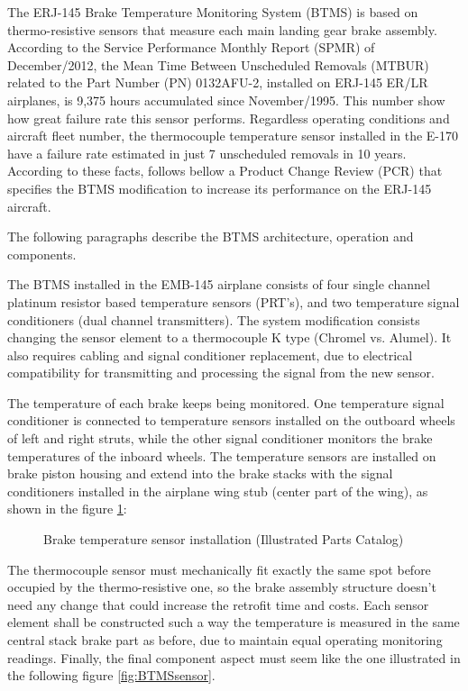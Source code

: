 ﻿The ERJ-145 Brake Temperature Monitoring System (BTMS) is based on thermo-resistive sensors that measure each main landing gear brake assembly. According to the Service Performance Monthly Report (SPMR) of December/2012, the Mean Time Between Unscheduled Removals (MTBUR) related to the Part Number (PN) 0132AFU-2, installed on ERJ-145 ER/LR airplanes, is 9,375 hours accumulated since November/1995. This number show how great failure rate this sensor performs. Regardless operating conditions and aircraft fleet number, the thermocouple temperature sensor installed in the E-170 have a failure rate estimated in just 7 unscheduled removals in 10 years. According to these facts, follows bellow a Product Change Review (PCR) that specifies the BTMS modification to increase its performance on the ERJ-145 aircraft.

The following paragraphs describe the BTMS architecture, operation and components.

The BTMS installed in the EMB-145 airplane consists of four single channel platinum resistor based temperature sensors (PRT's), and two temperature signal conditioners (dual channel transmitters). The system modification consists changing the sensor element to a thermocouple K type (Chromel vs. Alumel). It also requires cabling and signal conditioner replacement, due to electrical compatibility for transmitting and processing the signal from the new sensor.

The temperature of each brake keeps being monitored. One temperature signal conditioner is connected to temperature sensors installed on the outboard wheels of left and right struts, while the other signal conditioner monitors the brake temperatures of the inboard wheels. The temperature sensors are installed on brake piston housing and extend into the brake stacks with the signal conditioners installed in the airplane wing stub (center part of the wing), as shown in the figure \ref{fig:BTMSassembly}:

\begin{figure}[H] %
\caption{Brake temperature sensor installation (Illustrated Parts Catalog)}
\label{fig:BTMSassembly}
\end{figure}


The thermocouple sensor must mechanically fit exactly the same spot before occupied by the thermo-resistive one, so the brake assembly structure doesn't need any change that could increase the retrofit time and costs. Each sensor element shall be constructed such a way the temperature is measured in the same central stack brake part as before, due to maintain equal operating monitoring readings. Finally, the final component aspect must seem like the one illustrated in the following figure \ref{fig:BTMSsensor}.

